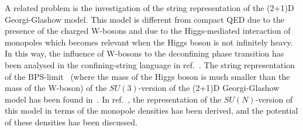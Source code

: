 \documentclass[a4paper,12pt]{article}
\begin{document}
A related problem is the investigation of the string representation of the (2+1)D Georgi-Glashow
model. This model is different from compact QED due to the presence of the charged W-bosons and due to the
Higgs-mediated interaction of monopoles which becomes relevant when the Higgs boson is not infinitely heavy.
In this way, the influence of W-bosons to the deconfining phase transition has been analysed in the confining-string language
in ref.~\cite{kogan}.
The string representation of
the BPS-limit~\cite{bps} (where the mass of the Higgs boson is much smaller than the mass of the
W-boson) of the $SU(3)$-version of the (2+1)D Georgi-Glashow model has been found in~\cite{nd}.
In ref.~\cite{mpla}, the representation of the $SU(N)$-version of this model in terms
of the monopole densities has been derived, and the potential of these densities has
been discussed.
\end{document}
